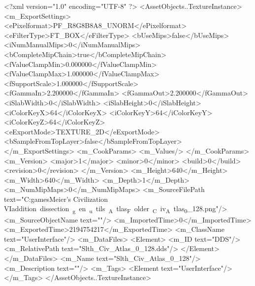 <?xml version="1.0" encoding="UTF-8" ?>
<AssetObjects..TextureInstance>
	<m_ExportSettings>
		<ePixelformat>PF_R8G8B8A8_UNORM</ePixelformat>
		<eFilterType>FT_BOX</eFilterType>
		<bUseMips>false</bUseMips>
		<iNumManualMips>0</iNumManualMips>
		<bCompleteMipChain>true</bCompleteMipChain>
		<fValueClampMin>0.000000</fValueClampMin>
		<fValueClampMax>1.000000</fValueClampMax>
		<fSupportScale>1.000000</fSupportScale>
		<fGammaIn>2.200000</fGammaIn>
		<fGammaOut>2.200000</fGammaOut>
		<iSlabWidth>0</iSlabWidth>
		<iSlabHeight>0</iSlabHeight>
		<iColorKeyX>64</iColorKeyX>
		<iColorKeyY>64</iColorKeyY>
		<iColorKeyZ>64</iColorKeyZ>
		<eExportMode>TEXTURE_2D</eExportMode>
		<bSampleFromTopLayer>false</bSampleFromTopLayer>
	</m_ExportSettings>
	<m_CookParams>
		<m_Values/>
	</m_CookParams>
	<m_Version>
		<major>1</major>
		<minor>0</minor>
		<build>0</build>
		<revision>0</revision>
	</m_Version>
	<m_Height>640</m_Height>
	<m_Width>640</m_Width>
	<m_Depth>1</m_Depth>
	<m_NumMipMaps>0</m_NumMipMaps>
	<m_SourceFilePath text="C:\Users\Sam\Documents\my games\Sid Meier's Civilization VI\Mods\unit addition dissection\python_gen\build_utils\CIV_Atlas_Folder\Slth_Civ_Atlas_0_128.png"/>
	<m_SourceObjectName text=""/>
	<m_ImportedTime>0</m_ImportedTime>
	<m_ExportedTime>2194754217</m_ExportedTime>
	<m_ClassName text="UserInterface"/>
	<m_DataFiles>
		<Element>
			<m_ID text="DDS"/>
			<m_RelativePath text="Slth_Civ_Atlas_0_128.dds"/>
		</Element>
	</m_DataFiles>
	<m_Name text="Slth_Civ_Atlas_0_128"/>
	<m_Description text=""/>
	<m_Tags>
		<Element text="UserInterface"/>
	</m_Tags>
</AssetObjects..TextureInstance>

